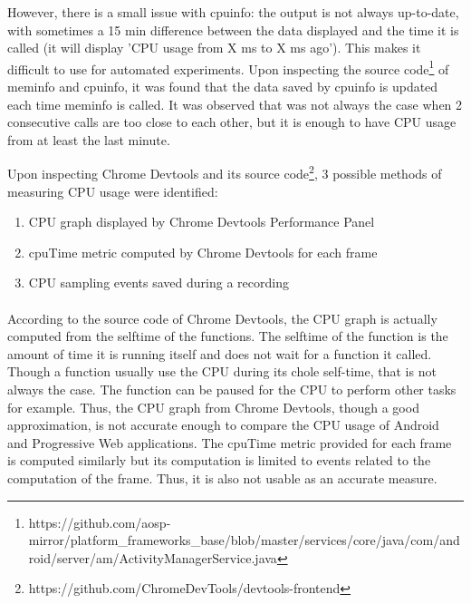 However, there is a small issue with cpuinfo: the output is not always up-to-date, with sometimes a 15 min difference between the data displayed and the time it is called (it will display 'CPU usage from X ms to X ms ago'). This makes it difficult to use for automated experiments. Upon inspecting the source code\footnote{https://github.com/aosp-mirror/platform\_frameworks\_base/blob/master/services/core/java/com/android/server/am/ActivityManagerService.java} of meminfo and cpuinfo, it was found that the data saved by cpuinfo is updated each time meminfo is called. It was observed that was not always the case when 2 consecutive calls are too close to each other, but it is enough to have CPU usage from at least the last minute.

Upon inspecting Chrome Devtools and its source code\footnote{https://github.com/ChromeDevTools/devtools-frontend}, 3 possible methods of measuring CPU usage were identified:
\begin{enumerate}
    \item CPU graph displayed by Chrome Devtools Performance Panel
    \item cpuTime metric computed by Chrome Devtools for each frame
    \item CPU sampling events saved during a recording
\end{enumerate}

\paragraph{}
According to the source code of Chrome Devtools, the CPU graph is actually computed from the selftime of the functions. The selftime of the function is the amount of time it is running itself and does not wait for a function it called. Though a function usually use the CPU during its chole self-time, that is not always the case. The function can be paused for the CPU to perform other tasks for example. Thus, the CPU graph from Chrome Devtools, though a good approximation, is not accurate enough to compare the CPU usage of Android and Progressive Web applications. \newline
The cpuTime metric provided for each frame is computed similarly but its computation is limited to events related to the computation of the frame. Thus, it is also not usable as an accurate measure.

